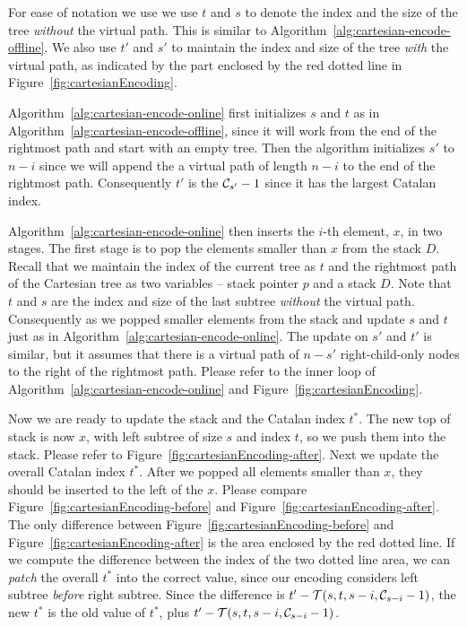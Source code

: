 For ease of notation we use we use $t$ and $s$ to denote the index and
the size of the tree {\em without} the virtual path.  This is similar to
Algorithm~\ref{alg:cartesian-encode-offline}.  We also use $t'$ and $s'$
to maintain the index and size of the tree {\em with} the virtual path,
as indicated by the part enclosed by the red dotted line in
Figure~\ref{fig:cartesianEncoding}.

Algorithm~\ref{alg:cartesian-encode-online} first initializes $s$ and
$t$ as in Algorithm~\ref{alg:cartesian-encode-offline}, since it will
work from the end of the rightmost path and start with an empty tree.
Then the algorithm initializes $s'$ to $n - i$ since we will append
the a virtual path of length $n - i$ to the end of the rightmost path.
Consequently $t'$ is the ${\cal C}_{s'} - 1$ since it has the largest
Catalan index.

Algorithm~\ref{alg:cartesian-encode-online} then inserts the $i$-th
element, $x$, in two stages.  The first stage is to pop the elements
smaller than $x$ from the stack $D$.  Recall that we maintain the
index of the current tree as $t$ and the rightmost path of the
Cartesian tree as two variables -- stack pointer $p$ and a stack $D$.
Note that $t$ and $s$ are the index and size of the last subtree {\em
  without} the virtual path.  Consequently as we popped smaller
elements from the stack and update $s$ and $t$ just as in
Algorithm~\ref{alg:cartesian-encode-online}.  The update on $s'$ and
$t'$ is similar, but it assumes that there is a virtual path of $n -
s'$ right-child-only nodes to the right of the rightmost path.  Please
refer to the inner loop of Algorithm~\ref{alg:cartesian-encode-online}
and Figure~\ref{fig:cartesianEncoding}.



Now we are ready to update the stack and the Catalan index $t^*$.  The
new top of stack is now $x$, with left subtree of size $s$ and index
$t$, so we push them into the stack.  Please refer to
Figure~\ref{fig:cartesianEncoding-after}.  Next we update the overall
Catalan index $t^*$.  After we popped all elements smaller than $x$,
they should be inserted to the left of the $x$.  Please compare
Figure~\ref{fig:cartesianEncoding-before} and
Figure~\ref{fig:cartesianEncoding-after}.  The only difference between
Figure~\ref{fig:cartesianEncoding-before} and
Figure~\ref{fig:cartesianEncoding-after} is the area enclosed by the red
dotted line.  If we compute the difference between the index of the two
dotted line area, we can {\em patch} the overall $t^*$ into the correct
value, since our encoding considers left subtree {\em before} right
subtree.  Since the difference is $t' - {\cal T}(s, t, s - i, {\cal
C}_{s-i} - 1)$, the new $t^*$ is the old value of $t^*$, plus $t' -
{\cal T}(s, t, s - i, {\cal C}_{s-i}
- 1)$.

